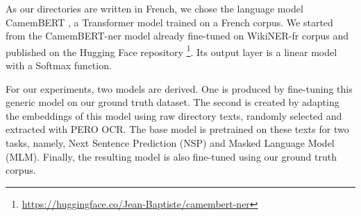 As our directories are written in French, we chose the language model CamemBERT \cite{martin-etal-2020-camembert}, a Transformer model trained on a French corpus. We started from the CamemBERT-ner model already fine-tuned on WikiNER-fr corpus and published on the Hugging Face repository \footnote{\url{https://huggingface.co/Jean-Baptiste/camembert-ner}}. Its output layer is a linear model with a Softmax function.

For our experiments, two models are derived. One is produced by fine-tuning this generic model on our ground truth dataset.
The second is created by adapting the embeddings of this model using raw directory texts, randomly selected and extracted with PERO OCR. The base model is pretrained on these texts for two tasks, namely, Next Sentence Prediction (NSP) and Masked Language Model (MLM). Finally, the resulting model is also fine-tuned using our ground truth corpus.



